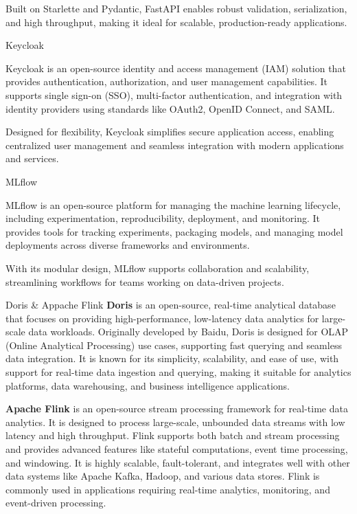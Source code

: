 Built on Starlette and Pydantic, FastAPI enables robust validation, serialization, and high throughput, making it ideal for scalable, production-ready applications.

\secc Keycloak

Keycloak is an open-source identity and access management (IAM) solution that provides authentication, authorization, and user management capabilities. It supports single sign-on (SSO), multi-factor authentication, and integration with identity providers using standards like OAuth2, OpenID Connect, and SAML.

Designed for flexibility, Keycloak simplifies secure application access, enabling centralized user management and seamless integration with modern applications and services.

\secc MLflow

MLflow is an open-source platform for managing the machine learning lifecycle, including experimentation, reproducibility, deployment, and monitoring. It provides tools for tracking experiments, packaging models, and managing model deployments across diverse frameworks and environments.

With its modular design, MLflow supports collaboration and scalability, streamlining workflows for teams working on data-driven projects.

\sec Doris \& Appache Flink
{\bf Doris} is an open-source, real-time analytical database that focuses on providing high-performance, low-latency data analytics for large-scale data workloads. Originally developed by Baidu, Doris is designed for OLAP (Online Analytical Processing) use cases, supporting fast querying and seamless data integration. It is known for its simplicity, scalability, and ease of use, with support for real-time data ingestion and querying, making it suitable for analytics platforms, data warehousing, and business intelligence applications.

{\bf Apache Flink} is an open-source stream processing framework for real-time data analytics. It is designed to process large-scale, unbounded data streams with low latency and high throughput. Flink supports both batch and stream processing and provides advanced features like stateful computations, event time processing, and windowing. It is highly scalable, fault-tolerant, and integrates well with other data systems like Apache Kafka, Hadoop, and various data stores. Flink is commonly used in applications requiring real-time analytics, monitoring, and event-driven processing.

